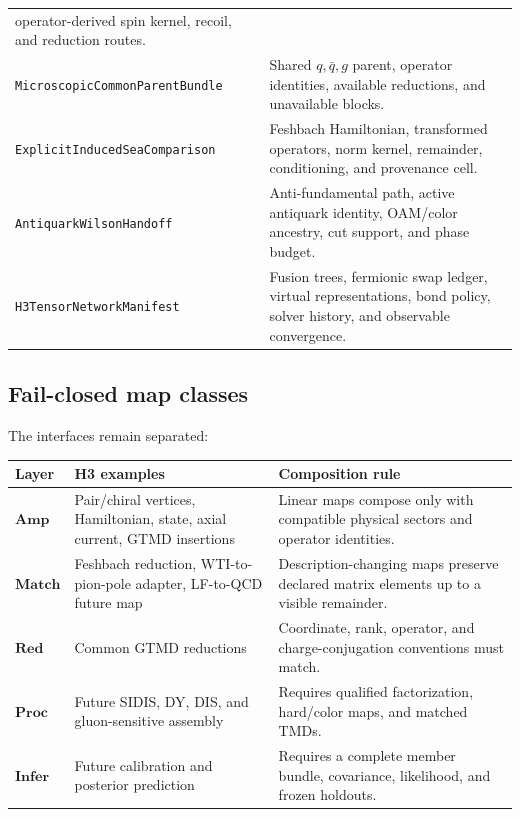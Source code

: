 \documentclass[11pt]{article}
\newcommand{\Amp}{\mathbf{Amp}}
\newcommand{\Match}{\mathbf{Match}}
\newcommand{\Red}{\mathbf{Red}}
\newcommand{\Proc}{\mathbf{Proc}}
\newcommand{\Infer}{\mathbf{Infer}}
\begin{document}
\begin{longtable}{L{0.29\textwidth}L{0.63\textwidth}}
operator-derived spin kernel, recoil, and reduction routes.\\
\texttt{MicroscopicCommon}\newline\texttt{ParentBundle} & Shared \(q,\bar q,g\) parent,
operator identities, available reductions, and unavailable blocks.\\
\texttt{ExplicitInducedSea}\newline\texttt{Comparison} & Feshbach Hamiltonian, transformed
operators, norm kernel, remainder, conditioning, and provenance cell.\\
\texttt{AntiquarkWilson}\newline\texttt{Handoff} & Anti-fundamental path, active antiquark
identity, OAM/color ancestry, cut support, and phase budget.\\
\texttt{H3TensorNetwork}\newline\texttt{Manifest} & Fusion trees, fermionic swap ledger,
virtual representations, bond policy, solver history, and observable
convergence.\\
\bottomrule
\end{longtable}

\subsection{Fail-closed map classes}

The interfaces remain separated:
\begin{longtable}{L{0.15\textwidth}L{0.27\textwidth}L{0.48\textwidth}}
\toprule
Layer & H3 examples & Composition rule\\
\midrule
\endhead
\(\Amp\) & Pair/chiral vertices, Hamiltonian, state, axial current, GTMD
insertions & Linear maps compose only with compatible physical sectors and
operator identities.\\
\(\Match\) & Feshbach reduction, WTI-to-pion-pole adapter, LF-to-QCD future
map & Description-changing maps preserve declared matrix elements up to a
visible remainder.\\
\(\Red\) & Common GTMD reductions & Coordinate, rank,
operator, and charge-conjugation conventions must match.\\
\(\Proc\) & Future SIDIS, DY, DIS, and gluon-sensitive assembly & Requires
qualified factorization, hard/color maps, and matched TMDs.\\
\(\Infer\) & Future calibration and posterior prediction & Requires a complete
member bundle, covariance, likelihood, and frozen holdouts.\\
\bottomrule
\end{longtable}
\end{document}
